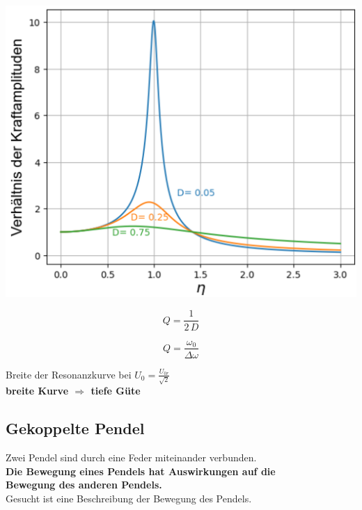 \begin{minipage}{0.4\linewidth}
\includegraphics[width=0.95\linewidth]{Bilder/Wellen-Optik/guete_resonanz} 
\end{minipage}
\hfill
\begin{minipage}{0.58\linewidth}

\begin{minipage}{0.48\linewidth}
$$ \boxed{Q = \frac{1}{2 \, D} } $$ 
\end{minipage}
\hfill
\begin{minipage}{0.48\linewidth}
$$ \boxed{ Q = \frac{\omega_0}{\Delta \omega} } $$
\end{minipage}

\vspace{0.2cm}

Breite der Resonanzkurve bei $U_0 = \frac{U_{0r}}{\sqrt{2}}$ \\


\textbf{breite Kurve $\Rightarrow$ tiefe Güte}
\end{minipage}



\subsection{Gekoppelte Pendel}
Zwei Pendel sind durch eine Feder miteinander verbunden. \\
\textbf{Die Bewegung eines Pendels hat Auswirkungen auf die \\
Bewegung des anderen Pendels.} \\
Gesucht ist eine Beschreibung der Bewegung des Pendels. \\

